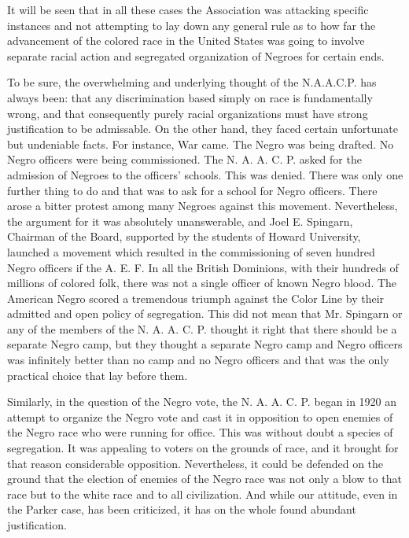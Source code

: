 \documentclass[letterpaper,10pt,english]{jupyterBook}
\begin{document}
\sphinxAtStartPar
It will be seen that in all these cases the Association was attacking specific instances and not attempting to lay down any general rule as to how far the advancement of the colored race in the United States was going to involve separate racial action and segregated organization of Negroes for certain ends.

\sphinxAtStartPar
To be sure, the overwhelming and underlying thought of the N.A.A.C.P. has always been: that any discrimination based simply on race is fundamentally wrong, and that consequently purely racial organizations must have strong justification to be admissable. On the other hand, they faced certain unfortunate but undeniable facts. For instance, War came. The Negro was being drafted. No Negro officers were being commissioned. The N. A. A. C. P. asked for the admission of Negroes to the officers’ schools. This was denied. There was only one further thing to do and that was to ask for a school for Negro officers. There arose a bitter protest among many Negroes against this movement. Nevertheless, the argument for it was absolutely unanswerable, and Joel E. Spingarn, Chairman of the Board, supported by the students of Howard University, launched a movement which resulted in the commissioning of seven hundred Negro officers if the A. E. F. In all the British Dominions, with their hundreds of millions of colored folk, there was not a single officer of known Negro blood. The American Negro scored a tremendous triumph against the Color Line by their admitted and open policy of segregation. This did not mean that Mr. Spingarn or any of the members of the N. A. A. C. P. thought it right that there should be a separate Negro camp, but they thought a separate Negro camp and Negro officers was infinitely better than no camp and no Negro officers and that was the only practical choice that lay before them.

\sphinxAtStartPar
Similarly, in the question of the Negro vote, the N. A. A. C. P. began in 1920 an attempt to organize the Negro vote and cast it in opposition to open enemies of the Negro race who were running for office. This was without doubt a species of segregation. It was appealing to voters on the grounds of race, and it brought for that reason considerable opposition. Nevertheless, it could be defended on the ground that the election of enemies of the Negro race was not only a blow to that race but to the white race and to all civilization. And while our attitude, even in the Parker case, has been criticized, it has on the whole found abundant justification.
\end{document}
